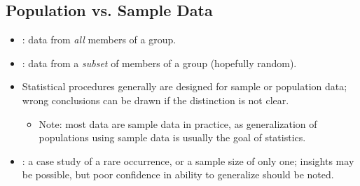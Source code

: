 \begin{itemize}
    \subsection{Population vs. Sample Data}
    \begin{itemize}
      \item {}: data from \emph{all} members of a group.
      \item {}: data from a \emph{subset} of members of a group (hopefully random).
      \item Statistical procedures generally are designed for sample or population data; wrong conclusions can be drawn if the distinction is not clear. 
        \begin{itemize}
          \item Note: most data are sample data in practice, as generalization of populations using sample data is usually the goal of statistics.
        \end{itemize}
      \item {}: a case study of a rare occurrence, or a sample size of only one; insights may be possible, but poor confidence in ability to generalize should be noted.
    \end{itemize}

\end{itemize}

